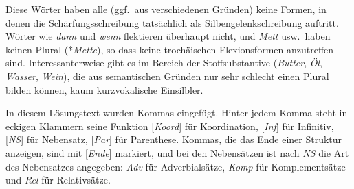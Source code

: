 \label{sol:morphosyntaktischeschreibprinzipien01} Diese Wörter haben alle (ggf.\ aus verschiedenen Gründen) keine Formen, in denen die Schärfungsschreibung tatsächlich als Silbengelenkschreibung auftritt.
Wörter wie \textit{dann} und \textit{wenn} flektieren überhaupt nicht, und \textit{Mett} usw.\ haben keinen Plural (*\textit{Mette}), so dass keine trochäischen Flexionsformen anzutreffen sind.
Interessanterweise gibt es im Bereich der Stoffsubstantive (\textit{Butter}, \textit{Öl}, \textit{Wasser}, \textit{Wein}), die aus semantischen Gründen nur sehr schlecht einen Plural bilden können, kaum kurzvokalische Einsilbler.

\label{sol:morphosyntaktischeschreibprinzipien02} In diesem Lösungstext wurden Kommas eingefügt.
Hinter jedem Komma steht in eckigen Klammern seine Funktion [\textit{Koord}] für Koordination, [\textit{Inf}] für Infinitiv, [\textit{NS}] für Nebensatz, [\textit{Par}] für Parenthese.
Kommas, die das Ende einer Struktur anzeigen, sind mit [\textit{Ende}] markiert, und bei den Nebensätzen ist nach \textit{NS} die Art des Nebensatzes angegeben: \textit{Adv} für Adverbialsätze, \textit{Komp} für Komplementsätze und \textit{Rel} für Relativsätze.

\vspace{0.5cm}

